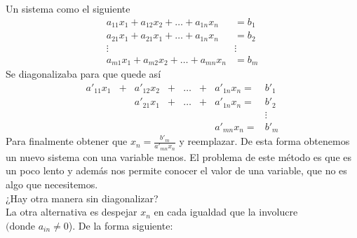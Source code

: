 \noindent Un sistema como el siguiente
\begin{equation*}
\begin{matrix}
    a_{11}x_1 +  a_{12}x_2 +  \ldots +  a_{1n}x_n & =  b_1 \\
    a_{21}x_1 +  a_{21}x_1 +  \ldots +  a_{1n}x_n & =  b_2 \\
                   \vdots                           & \vdots \\
    a_{m1}x_1 +  a_{m2}x_2 +  \ldots +  a_{mn}x_n & =  b_m
\end{matrix}
\end{equation*}
 Se diagonalizaba para que quede así
\begin{equation*}
 \begin{matrix}
    a'_{11}x_1& + & a'_{12}x_2& + & \ldots& + & a'_{1n}x_n = & b'_1 \\
              &  & a'_{21}x_1& + & \ldots& + & a'_{1n}x_n = & b'_2 \\
              &   &    &   &       &   &       &       \vdots \\
              &  & &  & &  & a'_{mn}x_n = & b'_m
\end{matrix}   
\end{equation*}
Para finalmente obtener que $x_n= \frac{b'_m}{a'_{mn}x_n}$ y reemplazar. De esta forma obtenemos un nuevo sistema con una variable menos. El problema de este método es que es un poco lento y además nos permite conocer el valor de una variable, que no es algo que necesitemos.\\

¿Hay otra manera sin diagonalizar?\\

\noindent La otra alternativa es despejar $x_n$ en cada igualdad que la involucre $(\text{donde } a_{in} \ne 0$). De la forma siguiente:\\

